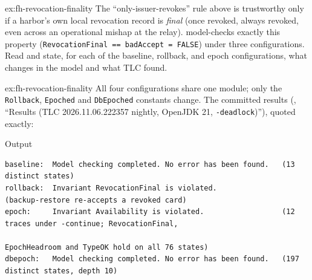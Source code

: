 \documentclass[11pt,a4paper]{article}
\theoremstyle{definition}
\theoremstyle{remark}
\begin{document}

\begin{pdexercise}[kind=Trace,rating=2]{ex:fh-revocation-finality}
The ``only-issuer-revokes'' rule above is trustworthy only if a harbor's own local revocation record is \emph{final} (once revoked, always revoked, even across an operational mishap at the relay).  model-checks exactly this property (\texttt{RevocationFinal == badAccept = FALSE}) under three configurations. Read  and state, for each of the baseline, rollback, and epoch configurations, what changes in the model and what TLC found.
\end{pdexercise}
\begin{pdsolution}{ex:fh-revocation-finality}
All four configurations share one module; only the \texttt{Rollback}, \texttt{Epoched} and \texttt{DbEpoched} constants change. The committed results (, ``Results (TLC 2026.11.06.222357 nightly, OpenJDK 21, \texttt{-deadlock})''), quoted exactly:
\begin{pdlisting}{Output}{}
\begin{lstlisting}[style=pdoutput]
baseline:  Model checking completed. No error has been found.   (13 distinct states)
rollback:  Invariant RevocationFinal is violated.               (backup-restore re-accepts a revoked card)
epoch:     Invariant Availability is violated.                  (12 traces under -continue; RevocationFinal,
                                                                  EpochHeadroom and TypeOK hold on all 76 states)
dbepoch:   Model checking completed. No error has been found.   (197 distinct states, depth 10)
\end{lstlisting}
\end{pdlisting}

\end{pdsolution}
\end{document}
